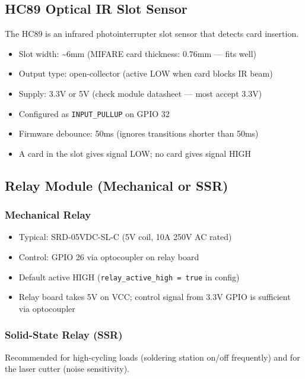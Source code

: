 \subsection{HC89 Optical IR Slot Sensor}

The HC89 is an infrared photointerrupter slot sensor that detects card insertion.

\begin{itemize}[leftmargin=1.5em]
    \item Slot width: \textasciitilde{}6mm (MIFARE card thickness: 0.76mm --- fits well)
    \item Output type: open-collector (active LOW when card blocks IR beam)
    \item Supply: 3.3V or 5V (check module datasheet --- most accept 3.3V)
    \item Configured as \texttt{INPUT\_PULLUP} on GPIO 32
    \item Firmware debounce: 50ms (ignores transitions shorter than 50ms)
    \item A card in the slot gives signal LOW; no card gives signal HIGH
\end{itemize}

\subsection{Relay Module (Mechanical or SSR)}

\subsubsection{Mechanical Relay}
\begin{itemize}[leftmargin=1.5em]
    \item Typical: SRD-05VDC-SL-C (5V coil, 10A 250V AC rated)
    \item Control: GPIO 26 via optocoupler on relay board
    \item Default active HIGH (\texttt{relay\_active\_high = true} in config)
    \item Relay board takes 5V on VCC; control signal from 3.3V GPIO is sufficient via optocoupler
\end{itemize}

\subsubsection{Solid-State Relay (SSR)}
Recommended for high-cycling loads (soldering station on/off frequently) and for the laser cutter (noise sensitivity).

